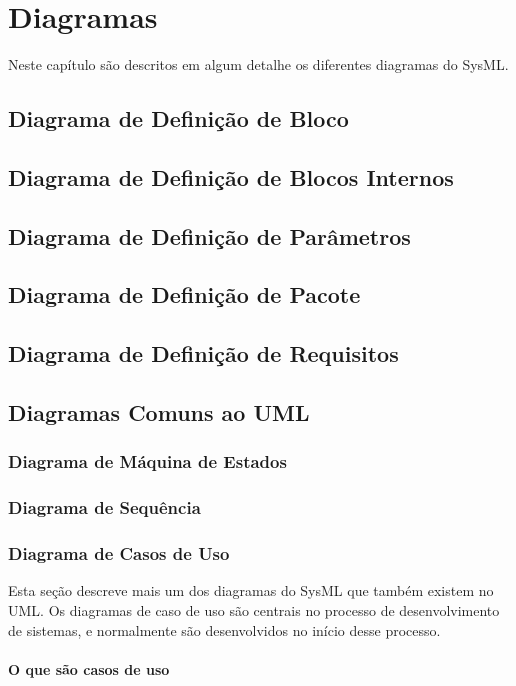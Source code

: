 \chapter{Diagramas}
\label{CAP2}

Neste capítulo são descritos em algum detalhe os diferentes diagramas do SysML. 

\section{Diagrama de Definição de Bloco}
\section{Diagrama de Definição de Blocos Internos}
\section{Diagrama de Definição de Parâmetros}
\section{Diagrama de Definição de Pacote}
\section{Diagrama de Definição de Requisitos}
\section{Diagramas Comuns ao UML}
\subsection{Diagrama de Máquina de Estados}
\subsection{Diagrama de Sequência}

\subsection{Diagrama de Casos de Uso}
Esta seção descreve mais um dos diagramas do SysML que também existem no UML. Os diagramas de caso de uso são centrais no processo de desenvolvimento de sistemas, e normalmente são desenvolvidos no início desse processo.

\subsubsection{O que são casos de uso}

